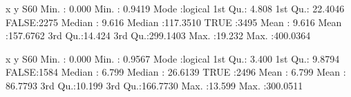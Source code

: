 \documentclass{amsart}\usepackage[]{graphicx}\usepackage[]{color}
\begin{document}
\begin{Schunk}
\begin{Soutput}
       x                y               S60         
 Min.   : 0.000   Min.   :  0.9419   Mode :logical  
 1st Qu.: 4.808   1st Qu.: 22.4046   FALSE:2275     
 Median : 9.616   Median :117.3510   TRUE :3495     
 Mean   : 9.616   Mean   :157.6762                  
 3rd Qu.:14.424   3rd Qu.:299.1403                  
 Max.   :19.232   Max.   :400.0364                  
\end{Soutput}
\begin{Soutput}
       x                y               S60         
 Min.   : 0.000   Min.   :  0.9567   Mode :logical  
 1st Qu.: 3.400   1st Qu.:  9.8794   FALSE:1584     
 Median : 6.799   Median : 26.6139   TRUE :2496     
 Mean   : 6.799   Mean   : 86.7793                  
 3rd Qu.:10.199   3rd Qu.:166.7730                  
 Max.   :13.599   Max.   :300.0511                  
\end{Soutput}
\end{Schunk}
\end{document}

